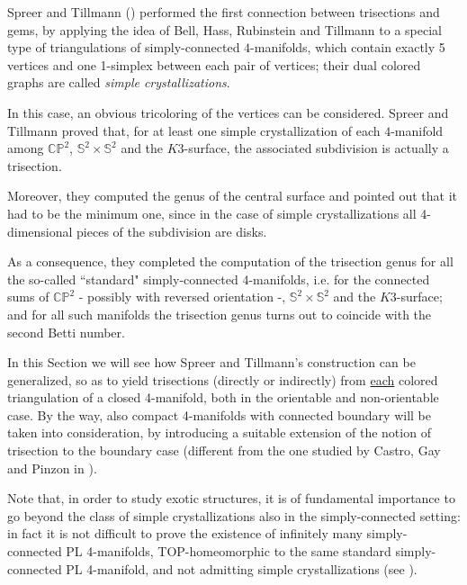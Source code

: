 \documentclass[12pt,a4paper]{article}
\begin{document}
\medskip 

Spreer and Tillmann (\cite{Spreer-Tillmann(Exp)})  performed the ﬁrst connection between trisections and gems, by applying the idea of Bell, Hass, Rubinstein and Tillmann to a special type of triangulations of simply-connected $4$-manifolds, which contain exactly 5 vertices and one 1-simplex between each pair of vertices; their dual colored graphs are called {\it simple crystallizations}.


In this case, an obvious tricoloring of the vertices can be considered. 
Spreer and Tillmann proved that, for at least one simple crystallization of each $4$-manifold among $\mathbb{CP}^2$, $\mathbb{S}^2 \times \mathbb{S}^2$ and the $K3$-surface, the associated subdivision is actually a trisection.
 
 Moreover, they computed the genus of the central surface and pointed out that it had to be the minimum one, since in the case of simple crystallizations all 4-dimensional pieces of the subdivision are disks.   

As a consequence, they completed the computation of the trisection genus for all the so-called ``standard" simply-connected 4-manifolds, i.e. for the connected sums of $\mathbb{CP}^2$ - possibly with reversed orientation -, $\mathbb{S}^2 \times \mathbb{S}^2$ and the $K3$-surface; and for all such manifolds the trisection genus turns out to coincide with the second Betti number.   


\bigskip

In this Section we will see how Spreer and Tillmann’s construction can be generalized, so as to yield  trisections (directly or indirectly) from \underline{each} colored triangulation of a closed 4-manifold, both in the orientable and non-orientable case.  
By the way, also compact 4-manifolds with connected boundary will be taken into consideration, by introducing a suitable extension of the notion of trisection to the boundary case (diﬀerent from the one studied by Castro, Gay and Pinzon in \cite{Castro-Gay-Pinzon}). 


Note that, in order to study exotic structures, it is of fundamental importance to go beyond the class of simple crystallizations also in the simply-connected setting: in fact it is not diﬃcult to prove the existence of inﬁnitely many simply-connected PL 4-manifolds, TOP-homeomorphic to the same standard simply-connected PL 4-manifold,  and not admitting simple crystallizations (see \cite[Prop. 32]{Casali-Cristofori ElecJComb 2015}). 
\end{document}
